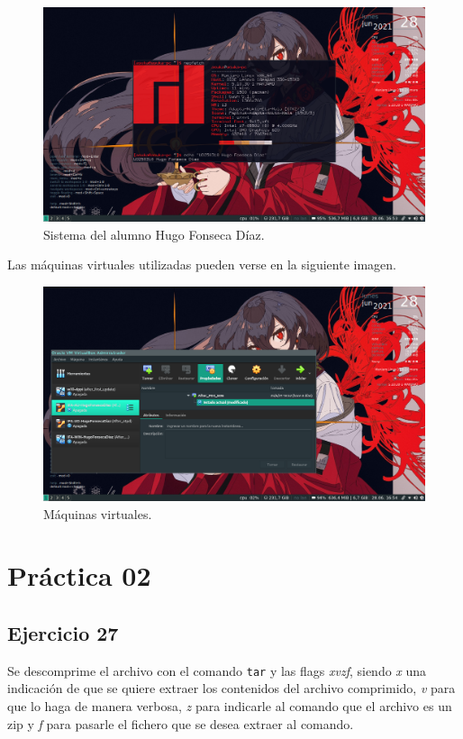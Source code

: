 \documentclass[11pt]{article}
\begin{document}
\begin{figure}[H]
  \caption{Sistema del alumno Hugo Fonseca Díaz.}
  \centering
    \includegraphics[scale=0.4, trim={0 1cm 0 0}, clip]{other/sistema_hugo.png}
\end{figure}

Las máquinas virtuales utilizadas pueden verse en la siguiente imagen.

\begin{figure}[H]
  \caption{Máquinas virtuales.}
  \centering
    \includegraphics[scale=0.4, trim={0 1cm 0 0}, clip]{other/maquinas_virtuales_hugo.png}
\end{figure}

\section{Práctica 02}

\subsection{Ejercicio 27}
Se descomprime el archivo con el comando \verb|tar| y las flags \textit{xvzf}, siendo \textit{x} una indicación de que se quiere extraer los contenidos del archivo comprimido, \textit{v} para que lo haga de manera verbosa, \textit{z} para indicarle al comando que el archivo es un zip y \textit{f} para pasarle el fichero que se desea extraer al comando.
\end{document}
